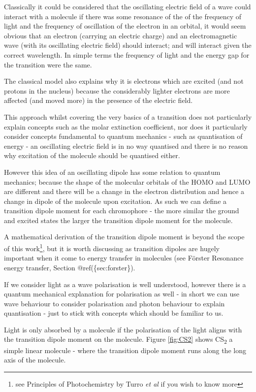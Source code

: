 \documentclass[
]{book}
\begin{document}
Classically it could be considered that the oscillating electric field of a wave could interact with a molecule if there was some resonance of the of the frequency of light and the frequency of oscillation of the electron in an orbital, it would seem obvious that an electron (carrying an electric charge) and an electromagnetic wave (with its oscillating electric field) should interact; and will interact given the correct wavelength. In simple terms the frequency of light and the energy gap for the transition were the same.

The classical model also explains why it is electrons which are excited (and not protons in the nucleus) because the considerably lighter electrons are more affected (and moved more) in the presence of the electric field.

This approach whilst covering the very basics of a transition does not particularly explain concepts such as the molar extinction coefficient, nor does it particularly consider concepts fundamental to quantum mechanics - such as quantisation of energy - an oscillating electric field is in no way quantised and there is no reason why excitation of the molecule should be quantised either.

However this idea of an oscillating dipole has some relation to quantum mechanics; because the shape of the molecular orbitals of the HOMO and LUMO are different and there will be a change in the electron distribution and hence a change in dipole of the molecule upon excitation. As such we can define a transition dipole moment for each chromophore - the more similar the ground and excited states the larger the transition dipole moment for the molecule.

A mathematical derivation of the transition dipole moment is beyond the scope of this work\footnote{see Principles of Photochemistry by Turro \emph{et al} if you wish to know more}, but it is worth discussing as transition dipoles are hugely important when it come to energy transfer in molecules (see Förster Resonance energy transfer, Section @ref(\{sec:forster\}).

If we consider light as a wave polarisation is well understood, however there is a quantum mechanical explanation for polarisation as well - in short we can use wave behaviour to consider polarisation and photon behaviour to explain quantisation - just to stick with concepts which should be familiar to us.

Light is only absorbed by a molecule if the polarisation of the light aligns with the transition dipole moment on the molecule. Figure \ref{fig:CS2} shows CS\textsubscript{2} a simple linear molecule - where the transition dipole moment runs along the long axis of the molecule.
\end{document}
